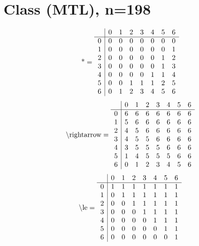 \documentclass[11pt]{article}
\begin{document}
\section{Class (MTL), n=198}
\[\text{*} = 
\begin{array}{r | r r r r r r r}
 & 0 & 1 & 2 & 3 & 4 & 5 & 6 \\ \hline
0 & 0 & 0 & 0 & 0 & 0 & 0 & 0 \\
1 & 0 & 0 & 0 & 0 & 0 & 0 & 1 \\
2 & 0 & 0 & 0 & 0 & 0 & 1 & 2 \\
3 & 0 & 0 & 0 & 0 & 0 & 1 & 3 \\
4 & 0 & 0 & 0 & 0 & 1 & 1 & 4 \\
5 & 0 & 0 & 1 & 1 & 1 & 2 & 5 \\
6 & 0 & 1 & 2 & 3 & 4 & 5 & 6 \\
\end{array}
\]
\[\text{\textbackslash rightarrow} = 
\begin{array}{r | r r r r r r r}
 & 0 & 1 & 2 & 3 & 4 & 5 & 6 \\ \hline
0 & 6 & 6 & 6 & 6 & 6 & 6 & 6 \\
1 & 5 & 6 & 6 & 6 & 6 & 6 & 6 \\
2 & 4 & 5 & 6 & 6 & 6 & 6 & 6 \\
3 & 4 & 5 & 5 & 6 & 6 & 6 & 6 \\
4 & 3 & 5 & 5 & 5 & 6 & 6 & 6 \\
5 & 1 & 4 & 5 & 5 & 5 & 6 & 6 \\
6 & 0 & 1 & 2 & 3 & 4 & 5 & 6 \\
\end{array}
\]
\[\text{\textbackslash le} = 
\begin{array}{r | r r r r r r r}
 & 0 & 1 & 2 & 3 & 4 & 5 & 6 \\ \hline
0 & 1 & 1 & 1 & 1 & 1 & 1 & 1 \\
1 & 0 & 1 & 1 & 1 & 1 & 1 & 1 \\
2 & 0 & 0 & 1 & 1 & 1 & 1 & 1 \\
3 & 0 & 0 & 0 & 1 & 1 & 1 & 1 \\
4 & 0 & 0 & 0 & 0 & 1 & 1 & 1 \\
5 & 0 & 0 & 0 & 0 & 0 & 1 & 1 \\
6 & 0 & 0 & 0 & 0 & 0 & 0 & 1 \\
\end{array}
\]
\end{document}
